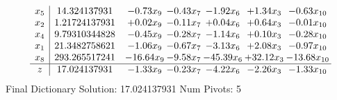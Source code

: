 \documentclass[9pt]{article}
\begin{document}
 \[\begin{array}{c| c c@{\hskip 2pt} c@{\hskip 2pt} c@{\hskip 2pt} c@{\hskip 2pt} c@{\hskip 2pt} }
 x_{5}   &  14.324137931 & -0.73 x_{9} & -0.43 x_{7} & -1.92 x_{6} & +  1.34 x_{3} & -0.63 x_{10}\\
 x_{2}   &  1.21724137931 & +  0.02 x_{9} & -0.11 x_{7} & +  0.04 x_{6} & +  0.64 x_{3} & -0.01 x_{10}\\
 x_{4}   &  9.79310344828 & -0.45 x_{9} & -0.28 x_{7} & -1.14 x_{6} & +  0.10 x_{3} & -0.28 x_{10}\\
 x_{1}   &  21.3482758621 & -1.06 x_{9} & -0.67 x_{7} & -3.13 x_{6} & +  2.08 x_{3} & -0.97 x_{10}\\
 x_{8}   &  293.265517241 & -16.64 x_{9} & -9.58 x_{7} & -45.39 x_{6} & + 32.12 x_{3} & -13.68 x_{10}\\
\hline
z    &  17.024137931 & -1.33 x_{9} & -0.23 x_{7} & -4.22 x_{6} & -2.26 x_{3} & -1.33 x_{10}\\
\end{array}\]
Final Dictionary
Solution:  17.024137931
Num Pivots:  5
\end{document}
